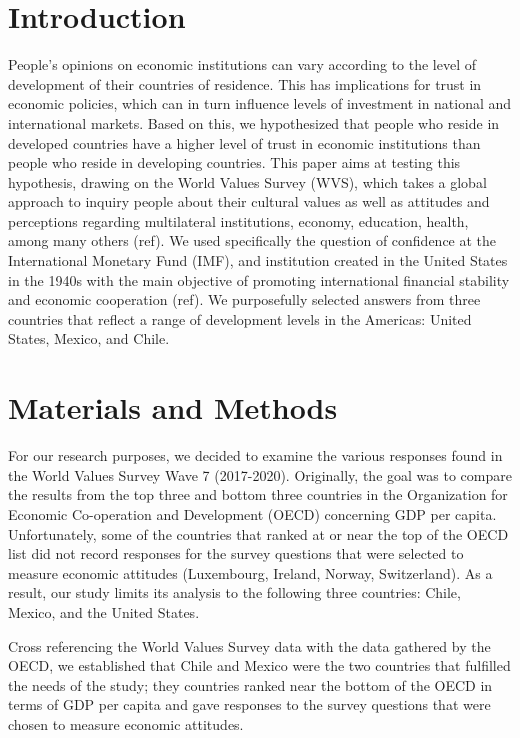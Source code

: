 \documentclass[12pt,halfline,a4paper,]{ouparticle}
\begin{document}
\hypertarget{introduction}{%
\section{Introduction}\label{introduction}}

People's opinions on economic institutions can vary according to the
level of development of their countries of residence. This has
implications for trust in economic policies, which can in turn influence
levels of investment in national and international markets. Based on
this, we hypothesized that people who reside in developed countries have
a higher level of trust in economic institutions than people who reside
in developing countries. This paper aims at testing this hypothesis,
drawing on the World Values Survey (WVS), which takes a global approach
to inquiry people about their cultural values as well as attitudes and
perceptions regarding multilateral institutions, economy, education,
health, among many others (ref). We used specifically the question of
confidence at the International Monetary Fund (IMF), and institution
created in the United States in the 1940s with the main objective of
promoting international financial stability and economic cooperation
(ref). We purposefully selected answers from three countries that
reflect a range of development levels in the Americas: United States,
Mexico, and Chile.

\hypertarget{materials-and-methods}{%
\section{Materials and Methods}\label{materials-and-methods}}

For our research purposes, we decided to examine the various responses
found in the World Values Survey Wave 7 (2017-2020). Originally, the
goal was to compare the results from the top three and bottom three
countries in the Organization for Economic Co-operation and Development
(OECD) concerning GDP per capita. Unfortunately, some of the countries
that ranked at or near the top of the OECD list did not record responses
for the survey questions that were selected to measure economic
attitudes (Luxembourg, Ireland, Norway, Switzerland). As a result, our
study limits its analysis to the following three countries: Chile,
Mexico, and the United States.

Cross referencing the World Values Survey data with the data gathered by
the OECD, we established that Chile and Mexico were the two countries
that fulfilled the needs of the study; they countries ranked near the
bottom of the OECD in terms of GDP per capita and gave responses to the
survey questions that were chosen to measure economic attitudes.
\end{document}

